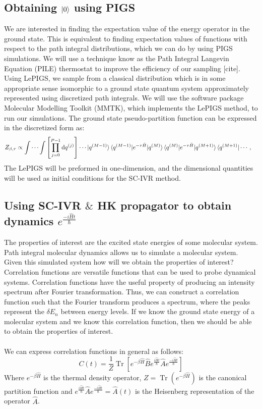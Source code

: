\documentclass[12pt,letterpaper,oneside,final,titlepage]{article}               %
\numberwithin{equation}{section} %
\newcommand{\eBH}{e^{-\beta\hat{H}}}
\newcommand{\emiHt}{e^{\frac{-i\hat{H}t}{\hbar}}}
\newcommand{\eiHt}{e^{\frac{i\hat{H}t}{\hbar}}}
\DeclareMathOperator{\Tr}{Tr}
\begin{document}
\subsection{Obtaining $\ket{0}$ using PIGS}
We are interested in finding the expectation value of the energy operator in the ground state. 
This is equivalent to finding expectation values of functions with respect to the path integral distributions, which we can do by using PIGS simulations.
We will use a technique know as the Path Integral Langevin Equation (PILE) thermostat to improve the efficiency of our sampling [cite].
Using LePIGS, we sample from a classical distribution which is in some appropriate sense isomorphic to a ground state quantum system approximately represented
using discretized path integrals. 
We will use the software package Molecular Modelling Toolkit (MMTK), which implements the LePIGS method, to run our simulations.
The ground state pseudo-partition function can be expressed in the discretized form as:
\newcommand{\bead}[1]{^{(#1)}}
\begin{align*}
    Z_{\beta,\tau}
    &\propto \idotsint \left[ \prod_{j=0}^{P-1} \dif q\bead{j} \right]
            \cdots \ket{q\bead{M-1}}
            \braket{q\bead{M-1} | e^{-\tau \hat{H}} | q\bead{M}}
            \braket{q\bead{M} | e^{-\tau \hat{H}} | q\bead{M+1}}
            \bra{q\bead{M+1}} \cdots,
\end{align*}
The LePIGS will be preformed in one-dimension, and the dimensional quantities will be used as initial conditions for the SC-IVR method.


\subsection{Using SC-IVR $\&$ HK propagator to obtain dynamics $\emiHt$} 
The properties of interest are the excited state energies of some molecular system. 
Path integral molecular dynamics allows us to simulate a molecular system. 
Given this simulated system how will we obtain the properties of interest?
Correlation functions are versatile functions that can be used to probe dynamical systems.
Correlation functions have the useful property of producing an intensity spectrum after Fourier transformation.
Thus, we can construct a correlation function such that the Fourier transform produces a spectrum, where the peaks
represent the $\delta E_{n}$ between energy levels.
If we know the ground state energy of a molecular system and we know this correlation function, then we should be able to obtain the properties of interest. \\ \\
We can express correlation functions in general as follows:
\begin{equation}
    C(t) = \frac{1}{Z}\Tr[\eBH\hat{B}\eiHt\hat{A}\emiHt]
\end{equation}
Where $\eBH$ is the thermal density operator, $Z = \Tr(\eBH)$ is the canonical partition function 
and $\eiHt\hat{A}\emiHt=\hat{A}(t)$ is the Heisenberg representation of the operator $\hat{A}$.
\end{document}
